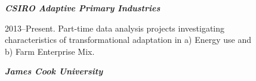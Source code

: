 \documentclass[a4paper,11pt]{article}
\begin{document}






{}


\bigskip
\medskip
\noindent\emph{\textbf{CSIRO Adaptive Primary Industries} \vspace{0.01in}}

2013--Present.  Part-time data analysis projects investigating \\
\ind characteristics of transformational adaptation in a) Energy use and \\
\ind b) Farm Enterprise Mix.

\noindent\emph{\textbf{James Cook University} \vspace{0.01in}}
\end{document}
